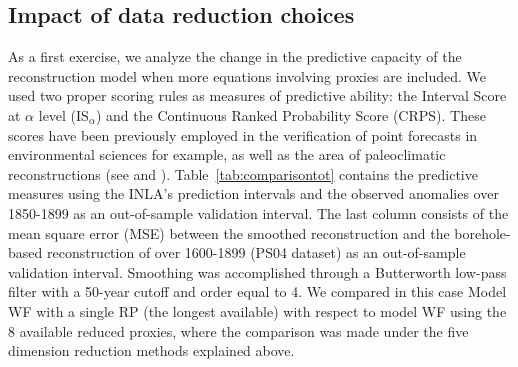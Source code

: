 \documentclass[12pt]{amsart}
\theoremstyle{plain}
\theoremstyle{definition}
\theoremstyle{remark}
\begin{document}
\subsection{Impact of data reduction choices}
As a first exercise, we analyze the change in the predictive capacity of the
reconstruction model when more equations involving proxies are included. We used
two proper scoring rules \cite{Gneiting2007a} as measures of predictive ability: the Interval Score at $\alpha$ level
(IS$_\alpha$) and the Continuous Ranked
Probability Score (CRPS). These scores have been previously employed in the
verification of point forecasts in environmental sciences for example, as well as the area
of paleoclimatic reconstructions (see \cite{Barboza2014} and
\cite{Scheuerer2014}). Table~\ref{tab:comparisontot} contains the predictive
measures using the INLA's prediction intervals and the observed
  anomalies over 1850-1899 as an out-of-sample validation interval. The
  last column consists of the mean square error (MSE) between the smoothed
  reconstruction and the borehole-based
reconstruction of \cite{Pollack2004} over 1600-1899 (PS04 dataset) as an out-of-sample
validation interval. Smoothing was accomplished through a Butterworth low-pass filter with a 50-year cutoff and order equal to 4. We compared in this case Model WF with a single RP
(the longest available) with respect to model WF using the 8 available reduced
proxies, where the comparison was made under the five dimension reduction
methods explained above.
\end{document}
